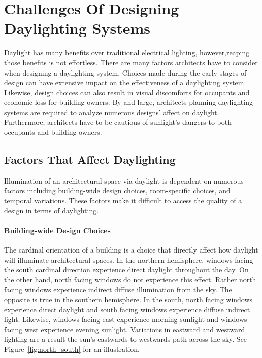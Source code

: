\section{Challenges Of Designing Daylighting Systems}
  
  Daylight has many benefits over traditional electrical lighting, however,reaping those benefits is not effortless. There are many factors architects have to consider when designing a daylighting system. Choices made during the early stages of design can have extensive impact on the effectiveness of a daylighting system. Likewise, design choices can also result in visual discomforts for occupants and economic loss for building owners. By and large, architects planning daylighting systems are required to analyze numerous designs' affect on daylight. Furthermore, architects have to be cautious of sunlight's dangers to both occupants and building owners.

  \subsection{Factors That Affect Daylighting}

    Illumination of an architectural space via daylight is dependent on numerous factors including building-wide design choices, room-specific choices, and temporal variations.
    These factors make it difficult to access the quality of a design in terms of daylighting.\\

    \paragraph{Building-wide Design Choices} 
    The cardinal orientation of a building is a choice that directly affect how daylight will illuminate architectural spaces. In the northern hemisphere, windows facing the south cardinal direction experience direct daylight throughout the day. On the other hand, north facing windows do not experience this effect. Rather north facing windows experience indirect diffuse illumination from the sky. The opposite is true in the southern hemisphere. In the south, north facing windows experience direct daylight and south facing windows experience diffuse indirect light. Likewise, windows facing east experience morning sunlight and windows facing west experience evening sunlight. Variations in eastward and westward lighting are a result the sun's eastwards to westwards path across the sky\cite{Robbins}. See Figure~\ref{fig:north_south} for an illustration.

